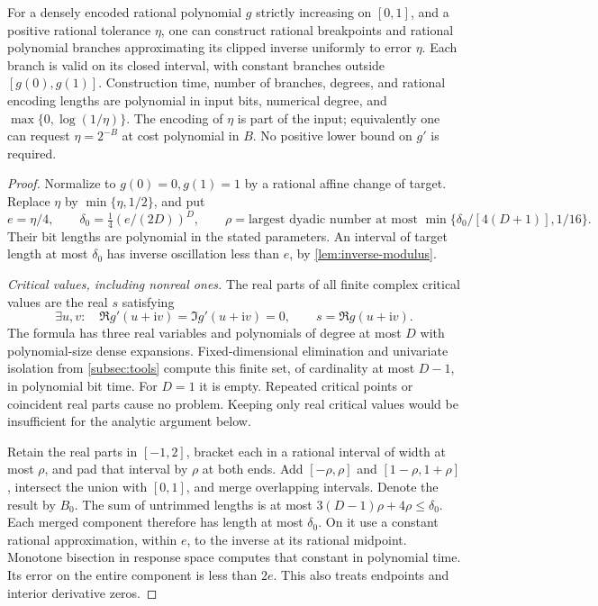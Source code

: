 \begin{theorem}\label{thm:inverse-approximation}
For a densely encoded rational polynomial $g$ strictly increasing on
$[0,1]$, and a positive rational tolerance $\eta$, one can construct
rational breakpoints and rational polynomial branches approximating its
clipped inverse uniformly to error $\eta$. Each branch is valid on its
closed interval, with constant branches outside $[g(0),g(1)]$.
Construction time, number of branches, degrees, and rational encoding
lengths are polynomial in input bits, numerical degree, and
$\max\{0,\log(1/\eta)\}$. The encoding of $\eta$ is part of the input;
equivalently one can request $\eta=2^{-B}$ at cost polynomial in $B$.
No positive lower bound on $g'$ is required.
\end{theorem}
\begin{proof}
Normalize to $g(0)=0,g(1)=1$ by a rational affine change of target.
Replace $\eta$ by $\min\{\eta,1/2\}$, and put
\begin{equation}\label{eq:inverse-bad-tolerance}
 e=\eta/4,\qquad \delta_0=\tfrac14(e/(2D))^D,\qquad
 \rho=\text{largest dyadic number at most }
          \min\{\delta_0/[4(D+1)],1/16\}.
\end{equation}
Their bit lengths are polynomial in the stated parameters. An interval
of target length at most $\delta_0$ has inverse oscillation less than
$e$, by \cref{lem:inverse-modulus}.

\emph{Critical values, including nonreal ones.}
The real parts of all finite complex critical values are the real $s$
satisfying
\begin{equation}\label{eq:critical-projection}
 \exists u,v:\quad
 \Re g'(u+\mathrm i v)=\Im g'(u+\mathrm i v)=0,\qquad
                         s=\Re g(u+\mathrm i v).
\end{equation}
The formula has three real variables and polynomials of degree at most
$D$ with polynomial-size dense expansions. Fixed-dimensional elimination
and univariate isolation from \cref{subsec:tools} compute this finite
set, of cardinality at most $D-1$, in polynomial bit time. For $D=1$ it
is empty. Repeated critical points or coincident real parts cause no
problem. Keeping only real critical values would be insufficient for the
analytic argument below.

Retain the real parts in $[-1,2]$, bracket each in a rational interval
of width at most $\rho$, and pad that interval by $\rho$ at both ends.
Add $[-\rho,\rho]$ and $[1-\rho,1+\rho]$, intersect the union with
$[0,1]$, and merge overlapping intervals. Denote the result by $B_0$.
The sum of untrimmed lengths is at most
$3(D-1)\rho+4\rho\le\delta_0$. Each merged component therefore has
length at most $\delta_0$. On it use a constant rational approximation,
within $e$, to the inverse at its rational midpoint. Monotone bisection
in response space computes that constant in polynomial time. Its error
on the entire component is less than $2e$. This also treats endpoints
and interior derivative zeros.


\end{proof}
